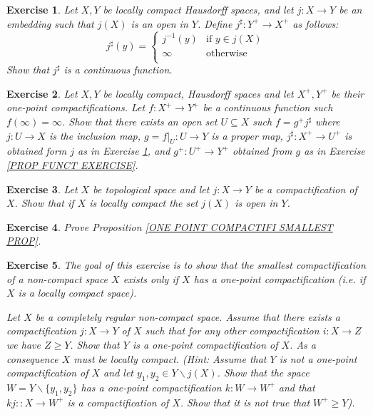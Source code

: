 \documentclass[11pt, letterpaper, oneside]{report}
\theoremstyle{pplain}
\newtheorem{ITERMVALUE THM}[theorem]{Intermediate Value Theorem}
\newtheorem{HEINEBOREL THM}[theorem]{Heine-Borel Theorem}
\newtheorem{UMETR THM}[theorem]{Urysohn Metrization Theorem}
\newtheorem{UMETR2 THM}[theorem]{Urysohn Metrization Theorem (v.2)}
\theoremstyle{ddefinition}
\theoremstyle{nnn}
\newtheorem{TDA NN}[theorem]{Topological Data Analysis. }
\theoremstyle{eexercise}
\newtheorem{exercise}{Exercise}[chapter]
\newcommand{\ssmin}{\smallsetminus}
\begin{document}
 
 
\begin{exercise}
\label{EMBEDDING ONE POINT COMPT EXERCISE}
Let $X, Y$ be locally compact Hausdorff  spaces, and let $j\colon X \to Y$ be an embedding such that 
$j(X)$ is an open in $Y$. Define $j^{{\sharp}}: Y^{+} \to X^{+}$ as follows: 
$$j^{{\sharp}}(y) = 
\begin{cases}
j^{-1}(y) & {\text{if }} y\in j(X) \\
\infty &  {\text{otherwise}} \\
\end{cases}
$$
Show that $j^{{\sharp}}$ is a continuous function.
\end{exercise}  
  
\begin{exercise}
Let $X, Y$ be locally compact, Hausdorff spaces and let $X^{+}, Y^{+}$ be their one-point compactifications. 
Let $f\colon X^{+}\to Y^{+}$ be a continuous function such $f(\infty) = \infty$. Show that there exists 
an open set $U\subseteq X$ such $f = g^{+}j^{{\sharp}}$ where  $j\colon U \to X$ is the inclusion map, 
 $g = f|_{U}\colon U \to Y$  is a proper map,   $j^{{\sharp}} \colon X^{+} \to U^{+}$ is obtained form $j$ 
as in Exercise \ref{EMBEDDING ONE POINT COMPT EXERCISE}, 
and  $g^{+} \colon U^{+}\to Y^{+}$ obtained from $g$  as in Exercise \ref{PROP FUNCT EXERCISE}.
\end{exercise}
  
  
\begin{exercise}
\label{LOC COMPACT OPEN COMPACTIFIC EXERCISE}
Let $X$ be topological space and let $j\colon X \to Y$ be a compactification of $X$. Show that
if $X$ is locally compact the set $j(X)$ is  open in $Y$. 
\end{exercise}  


 
  
  
\begin{exercise}
Prove Proposition \ref{ONE POINT COMPACTIFI SMALLEST PROP}. 
\end{exercise}


  
  
\begin{exercise}
\label{SMALLEST COMPACTIFI EXERCISE}
The goal of this exercise is to show that the smallest compactification of a non-compact 
space $X$ exists only if $X$ has a one-point compactification (i.e. if $X$ is a locally compact space). 

Let $X$ be a completely regular non-compact space. 
Assume that  there exists a compactification $j\colon X \to Y$
of $X$ such that for any other compactification $i\colon X \to Z$ we have $Z \geq Y$. Show that 
$Y$ is a one-point compactification of $X$. As a consequence $X$ must be locally compact. 
(Hint: Assume that $Y$ is not a one-point compactification of $X$ and let $y_{1}, y_{2} \in Y\ssmin j(X)$. 
Show that the space $W = Y\ssmin \{y_{1}, y_{2}\}$ has a one-point compactification $k\colon W \to W^{+}$ 
and that  $kj\colon \colon X \to W^{+}$ is a compactification of $X$. Show that  it is not true
that $W^{+} \geq Y$). 
\end{exercise}
\end{document}
